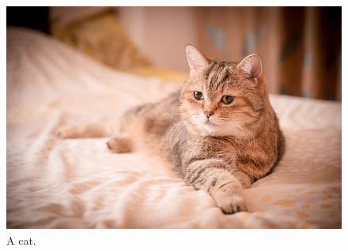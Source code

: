 \begin{figure}[!htbp]
\centering
\includegraphics{images/cat}
\caption{A cat.}
\label{i:cat}
\end{figure}
